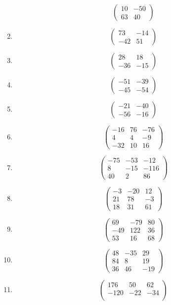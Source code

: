 \documentclass{article}%
\begin{document}
\begin{enumerate}[label=\arabic*)]
\[\begin{pmatrix}
10&-50\\%
63&40%
\end{pmatrix}%
\]%
\item%
\[%
\begin{pmatrix}%
73&-14\\%
-42&51%
\end{pmatrix}%
\]%
\item%
\[%
\begin{pmatrix}%
28&18\\%
-36&-15%
\end{pmatrix}%
\]%
\item%
\[%
\begin{pmatrix}%
-51&-39\\%
-45&-54%
\end{pmatrix}%
\]%
\item%
\[%
\begin{pmatrix}%
-21&-40\\%
-56&-16%
\end{pmatrix}%
\]%
\item%
\[%
\begin{pmatrix}%
-16&76&-76\\%
4&4&-9\\%
-32&10&16%
\end{pmatrix}%
\]%
\item%
\[%
\begin{pmatrix}%
-75&-53&-12\\%
8&-15&-116\\%
40&2&86%
\end{pmatrix}%
\]%
\item%
\[%
\begin{pmatrix}%
-3&-20&12\\%
21&78&-3\\%
18&31&61%
\end{pmatrix}%
\]%
\item%
\[%
\begin{pmatrix}%
69&-79&80\\%
-49&122&36\\%
53&16&68%
\end{pmatrix}%
\]%
\item%
\[%
\begin{pmatrix}%
48&-35&29\\%
84&8&19\\%
36&46&-19%
\end{pmatrix}%
\]%
\item%
\[%
\begin{pmatrix}%
176&50&62\\%
-120&-22&-34\\%

\end{pmatrix}\]
\end{enumerate}
\end{document}

